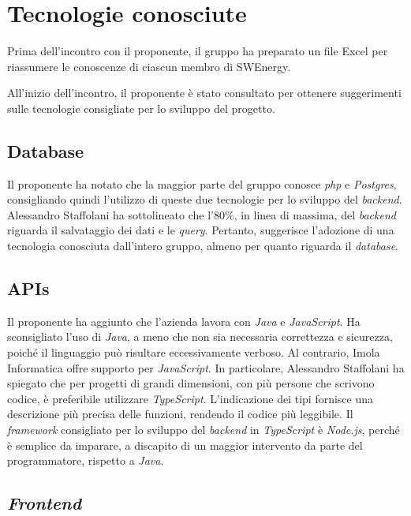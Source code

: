 \section{Tecnologie conosciute}

Prima dell'incontro con il proponente, il gruppo ha preparato un file Excel
per riassumere le conoscenze di ciascun membro di SWEnergy.

All'inizio dell'incontro, il proponente è stato consultato per ottenere
suggerimenti sulle tecnologie consigliate per lo sviluppo del progetto.

\subsection{Database}

Il proponente ha notato che la maggior parte del gruppo conosce \textit{php} e
\textit{Postgres}, consigliando quindi l'utilizzo di queste due tecnologie per
lo sviluppo del \textit{backend}. Alessandro Staffolani ha sottolineato che l'80\%, in linea di
massima, del \textit{backend} riguarda il salvataggio dei dati e le \textit{query}. Pertanto,
suggerisce l'adozione di una tecnologia conosciuta dall'intero gruppo, almeno
per quanto riguarda il \textit{database}.

\subsection{APIs}

Il proponente ha aggiunto che l'azienda lavora con \textit{Java} e
\textit{JavaScript}. Ha sconsigliato l'uso di \textit{Java}, a meno che non sia
necessaria correttezza e sicurezza, poiché il linguaggio può risultare
eccessivamente verboso. Al contrario, Imola Informatica offre supporto per
\textit{JavaScript}. In particolare, Alessandro Staffolani ha spiegato che per progetti di
grandi dimensioni, con più persone che scrivono codice, è preferibile
utilizzare \textit{TypeScript}. L'indicazione dei tipi fornisce una
descrizione più precisa delle funzioni, rendendo il codice più leggibile. Il
\textit{framework} consigliato per lo sviluppo del \textit{backend} in
\textit{TypeScript} è \textit{Node.js}, perché è semplice da imparare, a
discapito di un maggior intervento da parte del programmatore,
rispetto a \textit{Java}.

\subsection{\textit{Frontend}}

